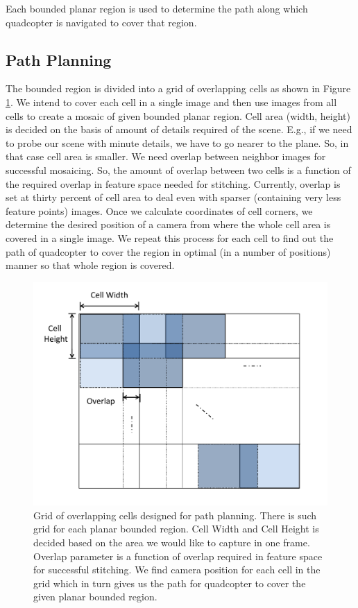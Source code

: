Each bounded planar region is used to determine the path along which
quadcopter is navigated to cover that region.

\subsection{Path Planning}
The bounded region is divided into a grid of overlapping cells as shown in
Figure \ref{fig:grid}. We intend to cover each cell in a single image and then
use images from all cells to create a mosaic of given bounded planar
region. Cell area (width, height) is decided on the basis of amount of details required of the
scene. E.g., if we need to probe our scene with minute details, we have to go
nearer to the plane. So, in that case cell area is smaller. We need
overlap between neighbor images for successful mosaicing. So, the amount of
overlap between two cells is a function of the required overlap in feature space
needed for stitching. Currently, overlap is set at thirty percent of cell area to deal
even with sparser (containing very less feature points) images. Once we
calculate coordinates of cell corners, we determine the desired position of
a camera from where the whole cell area is covered in a single image. We repeat
this process for each cell to find out the path of quadcopter to cover the region in
optimal (in a number of positions) manner so that whole region is covered.

\begin{figure}[h!]
\centering
\includegraphics[width=\linewidth]{figures/multiplanar/PathPlanningGrid}
\caption[Path planning]{Grid of overlapping cells designed for path planning.
There is such grid for each planar bounded region. Cell Width and Cell Height is decided based
on the area we would like to capture in one frame. Overlap parameter is
a function of overlap required in feature space for successful stitching.
We find camera position for each cell in the grid which in turn
gives us the path for quadcopter to cover the given planar bounded region.}
\label{fig:grid}
\end{figure}

